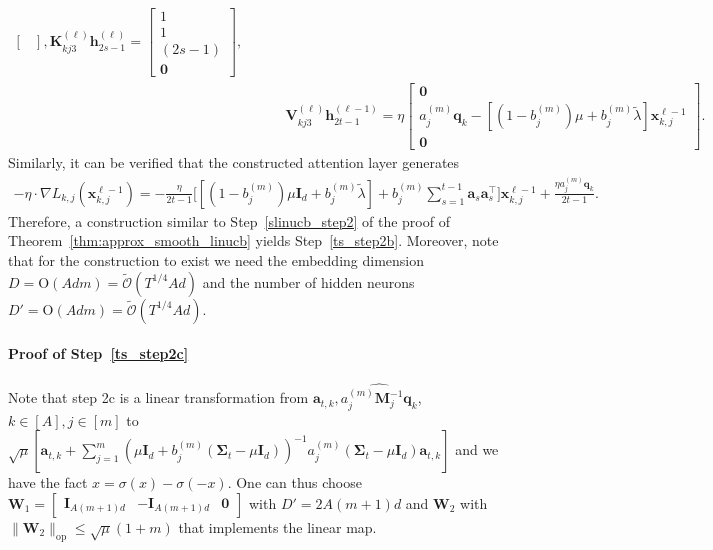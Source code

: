\documentclass[10pt]{article}
\newcommand{\id}{\bI}
\newcommand{\lops}[1]{\|{#1}\|_{\mathrm{op}}}
\newcommand{\<}{\left\langle}
\renewcommand{\>}{\right\rangle}
\newcommand{\bzero}{{\mathbf 0}}
\newcommand{\Tpscov}{{{\mathbf\Sigma}}}
\newcommand{\prodeig}{{\mu}}
\newcommand{\intvec}{{\mathbf {q}}}
\newcommand{\intmat}{{\mathbf {M}}}
\newcommand{\tcO}{{\tilde{\mathcal O}}}
\newcommand{\hidden}{{D'}}
\newcommand{\conO}{{\mathrm{O}}}
\def\bI{{\mathbf I}}
\def\bK{{\mathbf K}}
\def\bV{{\mathbf V}}
\def\bW{{\mathbf W}}
\def\ba{{\mathbf a}}
\def\bh{{\mathbf h}}
\def\bx{{\mathbf x}}
\begin{document}
\begin{align*}
\begin{bmatrix}
    \end{bmatrix}, 
\bK_{kj3}^{(\ell)}\bh^{(\ell)}_{2s-1}=\begin{bmatrix}
        1\\ 1 \\(2s-1)\\\bzero
    \end{bmatrix}, \\&\qquad~\bV_{kj3}^{(\ell)}\bh^{(\ell-1)}_{2t-1}=\eta\begin{bmatrix}
        \bzero\\ a_j^{(m)}\intvec_k-[(1-b_j^{(m)})\prodeig+b_j^{(m)}\tilde\lambda]\bx_{k,j}^{\ell-1}\\ \bzero
    \end{bmatrix}.
\end{align*}
Similarly, it can be verified that the constructed attention layer generates 
\begin{align*}
  -\eta\cdot\nabla L_{k,j}(\bx_{k,j}^{\ell-1})=-\frac{\eta}{2t-1}\Big[ [(1-b_j^{(m)})\prodeig\id_d+b_j^{(m)}\tilde\lambda]+b_j^{(m)}\sum_{s=1}^{t-1}\ba_s\ba_s^\top \Big]\bx_{k,j}^{\ell-1}+\frac{\eta a_j^{(m)}\intvec_k}{2t-1}.
\end{align*} 
Therefore,  a  construction similar to  Step~\ref{slinucb_step2} of the proof of Theorem~\ref{thm:approx_smooth_linucb} yields Step~\ref{ts_step2b}. Moreover, note that for the construction to exist  we need the embedding dimension  $D=\conO(Adm)=\tcO(T^{1/4}Ad)$ and the number of hidden neurons $\hidden=\conO(Adm)=\tcO(T^{1/4}Ad)$.

\paragraph{Proof of Step~\ref{ts_step2c}}
Note that step 2c is a linear transformation from $\ba_{t,k},\widehat{a_j^{(m)}\intmat_j^{-1}\intvec_k}$, $k\in[A],j\in[m]$ to  $\sqrt{\prodeig} [\ba_{t,k}+\sum_{j=1}^m ({\prodeig}\id_d+{b_j^{(m)}(\Tpscov_t-\prodeig \id_d)})^{-1}{a_j^{(m)}(\Tpscov_t-\prodeig \id_d)\ba_{t,k}} ]$ and we have the fact $x=\sigma(x)-\sigma(-x)$. One can thus choose $\bW_1=\begin{bmatrix}
    \id_{A(m+1)d} & -\id_{A(m+1)d}&\bzero
\end{bmatrix}$ with $\hidden=2A(m+1)d$ and $\bW_2$ with $\lops{\bW_2}\leq \sqrt{\prodeig}(1+m)$ that implements the linear map.
\end{document}

